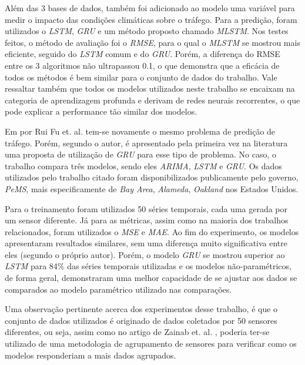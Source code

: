 Além das 3 bases de dados, também foi adicionado ao modelo uma variável para medir o impacto das condições climáticas sobre o tráfego.
Para a predição, foram utilizados o \textit{\acrshort{LSTM}}, \textit{\acrshort{GRU}} e um método proposto chamado \textit{\acrfull{MLSTM}}. Nos testes feitos, o método de avaliação foi o \textit{\acrshort{RMSE}}, para o qual o \textit{\acrshort{MLSTM}} se mostrou mais eficiente, seguido do \textit{\acrshort{LSTM}} comum e do \textit{\acrshort{GRU}}. Porém, a diferença do RMSE entre os 3 algoritmos não ultrapassou 0.1, o que demonstra que a eficácia de todos os métodos é bem similar para o conjunto de dados do trabalho. Vale ressaltar também que todos os modelos utilizados neste trabalho se encaixam na categoria de aprendizagem profunda e derivam de redes neurais recorrentes, o que pode explicar a performance tão similar dos modelos.

Em  \cite{fu2016using} por Rui Fu et. al. tem-se novamente o mesmo problema de predição de tráfego. Porém, segundo o autor, é apresentado pela primeira vez na literatura uma proposta de utilização de \textit{\acrfull{GRU}} para esse tipo de problema. No caso, o trabalho compara três modelos, sendo eles \textit{\acrshort{ARIMA}}, \textit{\acrshort{LSTM}} e \textit{\acrshort{GRU}}. Os dados utilizados pelo trabalho citado foram disponibilizados publicamente pelo governo, \textit{PeMS}, mais especificamente de \textit{Bay Area}, \textit{Alameda}, \textit{Oakland} nos Estados Unidos. 

Para o treinamento foram utilizados 50 séries temporais, cada uma gerada por um sensor diferente. Já para as métricas, assim como na maioria dos trabalhos relacionados, foram utilizados o \textit{\acrshort{MSE}} e \textit{\acrshort{MAE}}. Ao fim do experimento, os modelos apresentaram resultados similares, sem uma diferença muito significativa entre eles (segundo o próprio autor). Porém, o modelo \textit{\acrshort{GRU}} se mostrou superior ao \textit{\acrshort{LSTM}} para 84\% das séries temporais utilizadas e os modelos não-paramétricos, de forma geral, demonstraram uma melhor capacidade de se ajustar aos dados se comparados ao modelo paramétrico utilizado nas comparações.

Uma observação pertinente acerca dos experimentos desse trabalho, é que o conjunto de dados utilizados é originado de dados coletados por 50 sensores diferentes, ou seja, assim como no artigo de Zainab et. al. \cite{Zainab_2018}, poderia ter-se utilizado de uma metodologia de agrupamento de sensores para verificar como os modelos responderiam a mais dados agrupados.

